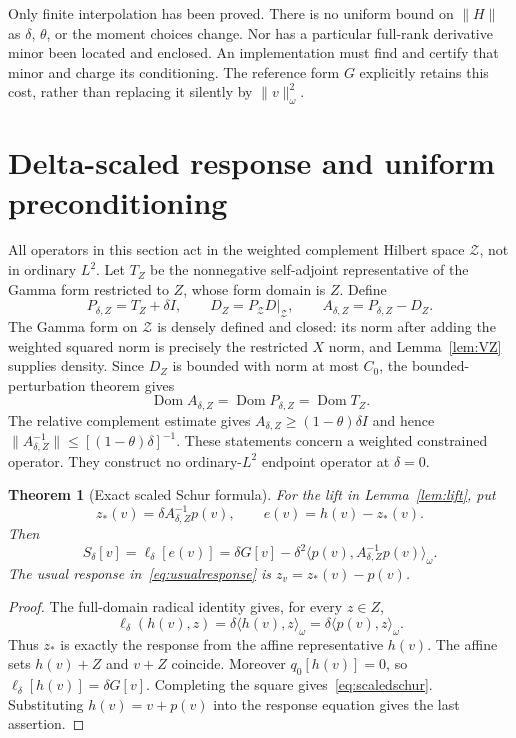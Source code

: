 \documentclass[11pt,a4paper]{article}
\numberwithin{equation}{section}
\newtheorem{theorem}{Theorem}[section]
\theoremstyle{remark}
\newcommand{\dom}{\operatorname{Dom}}
\newcommand{\ip}[2]{\langle #1,#2\rangle}
\newcommand{\norm}[1]{\lVert #1\rVert}
\newcommand{\Zc}{\mathcal Z}
\begin{document}
Only finite interpolation has been proved. There is no uniform bound on $\norm H$ as $\delta$, $\theta$, or the moment choices change. Nor has a particular full-rank derivative minor been located and enclosed. An implementation must find and certify that minor and charge its conditioning. The reference form $G$ explicitly retains this cost, rather than replacing it silently by $\norm v_\omega^2$.

\section{Delta-scaled response and uniform preconditioning}\label{sec:response}

All operators in this section act in the weighted complement Hilbert space $\Zc$, not in ordinary $L^2$. Let $T_Z$ be the nonnegative self-adjoint representative of the Gamma form restricted to $Z$, whose form domain is $Z$. Define
\begin{equation}\label{eq:weightedops}
 P_{\delta,Z}=T_Z+\delta I,\qquad
 D_Z=P_{\Zc}D|_{\Zc},\qquad
 A_{\delta,Z}=P_{\delta,Z}-D_Z.
\end{equation}
The Gamma form on $\Zc$ is densely defined and closed: its norm after adding the weighted squared norm is precisely the restricted $X$ norm, and Lemma~\ref{lem:VZ} supplies density. Since $D_Z$ is bounded with norm at most $C_0$, the bounded-perturbation theorem gives
\begin{equation}\label{eq:opdomains}
 \dom A_{\delta,Z}=\dom P_{\delta,Z}=\dom T_Z.
\end{equation}
The relative complement estimate gives
$A_{\delta,Z}\ge(1-\theta)\delta I$ and hence
$\norm{A_{\delta,Z}^{-1}}\le[(1-\theta)\delta]^{-1}$.
These statements concern a weighted constrained operator. They construct no ordinary-$L^2$ endpoint operator at $\delta=0$.

\begin{theorem}[Exact scaled Schur formula]\label{thm:scaled}
For the lift in Lemma~\ref{lem:lift}, put
\begin{equation}\label{eq:liftresponse}
 z_*(v)=\delta A_{\delta,Z}^{-1}p(v),\qquad
 e(v)=h(v)-z_*(v).
\end{equation}
Then
\begin{equation}\label{eq:scaledschur}
 S_\delta[v]=\ell_\delta[e(v)]
 =\delta G[v]-\delta^2\ip{p(v)}{A_{\delta,Z}^{-1}p(v)}_\omega.
\end{equation}
The usual response in~\eqref{eq:usualresponse} is $z_v=z_*(v)-p(v)$.
\end{theorem}
\begin{proof}
The full-domain radical identity gives, for every $z\in Z$,
\[
 \ell_\delta(h(v),z)=\delta\ip{h(v)}z_\omega
                    =\delta\ip{p(v)}z_\omega.
\]
Thus $z_*$ is exactly the response from the affine representative $h(v)$. The affine sets $h(v)+Z$ and $v+Z$ coincide. Moreover $q_0[h(v)]=0$, so $\ell_\delta[h(v)]=\delta G[v]$. Completing the square gives~\eqref{eq:scaledschur}. Substituting $h(v)=v+p(v)$ into the response equation gives the last assertion.
\end{proof}
\end{document}
